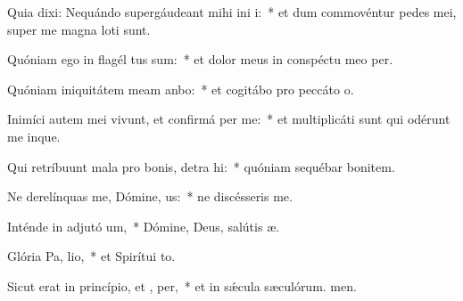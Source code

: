 \item Quia dixi: Nequándo supergáudeant mihi ini i:~* et dum commovéntur pedes mei, super me magna loti sunt.
\item Quóniam ego in flagél tus sum:~* et dolor meus in conspéctu meo per.
\item Quóniam iniquitátem meam anbo:~* et cogitábo pro peccáto o.
\item Inimíci autem mei vivunt, et confirmá  per me:~* et multiplicáti sunt qui odérunt me inque.
\item Qui retríbuunt mala pro bonis, detra hi:~* quóniam sequébar bonitem.
\item Ne derelínquas me, Dómine,  us:~* ne discésseris  me.
\item Inténde in adjutó um,~* Dómine, Deus, salútis æ.
\item Glória Pa,  lio,~* et Spirítui to.
\item Sicut erat in princípio, et ,  per,~* et in sǽcula sæculórum. men.
